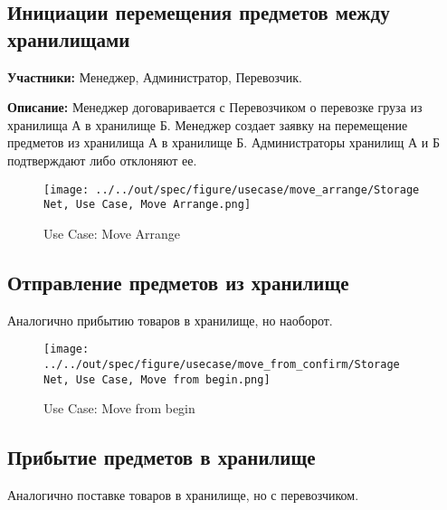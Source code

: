 
\subsection{Инициации перемещения предметов между хранилищами}

\textbf{Участники:}
Менеджер, Администратор, Перевозчик.

\textbf{Описание:}
Менеджер договаривается с Перевозчиком о перевозке груза из 
хранилища А в хранилище Б. Менеджер создает заявку на перемещение
предметов из хранилища А в хранилище Б. Администраторы хранилищ 
А и Б подтверждают либо отклоняют ее.

\begin{figure}[h]
  \centering
  \texttt{[image: ../../out/spec/figure/usecase/move\_arrange/Storage Net, Use Case, Move Arrange.png]}
  \caption{Use Case: Move Arrange}
\end{figure}

\subsection{Отправление предметов из хранилище}
Аналогично прибытию товаров в хранилище, но наоборот.

\begin{figure}[h]
  \centering
  \texttt{[image: ../../out/spec/figure/usecase/move\_from\_confirm/Storage Net, Use Case, Move from begin.png]}
  \caption{Use Case: Move from begin}
\end{figure}

\subsection{Прибытие предметов в хранилище}
Аналогично поставке товаров в хранилище, но с перевозчиком.
